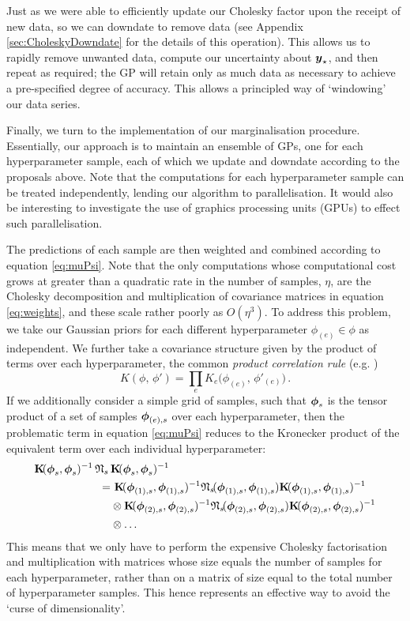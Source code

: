\documentclass{acmtrans2m}
\begin{document}
Just as we were able to efficiently update our Cholesky factor upon the receipt of new data, so we can downdate to remove data (see Appendix \ref{sec:CholeskyDowndate} for the details of this operation). This allows us to rapidly remove unwanted data, compute our uncertainty about $\boldsymbol{y}_\star$, and then repeat as required; the GP will retain only as much data as necessary to achieve a pre-specified degree of accuracy. This allows a principled way of `windowing' our data series.

Finally, we turn to the implementation of our marginalisation procedure. Essentially, our approach is to maintain an ensemble of GPs, one for each hyperparameter sample, each of which we update and downdate according to the proposals above. Note that the computations for each hyperparameter sample can be treated independently, lending our algorithm to parallelisation. It would also be interesting to investigate the use of graphics processing units (GPUs) to effect such parallelisation.

The predictions of each sample are then weighted and combined according to equation \eqref{eq:muPsi}. Note that the only computations whose computational cost grows at greater than a quadratic rate in the number of samples, $\eta$, are the Cholesky decomposition and multiplication of covariance matrices in equation \eqref{eq:weights}, and these scale rather poorly as $O(\eta^3)$. To address this problem, we take our Gaussian priors for each different hyperparameter $\phi_{(e)} \in \phi$ as independent. We further take a covariance structure given by the product of terms over each hyperparameter, the common \emph{product correlation rule} (e.g. )
\begin{equation}
 K(\phi,\,\phi')=\prod_e K_e\Big(\phi_{(e)},\,\phi'_{(e)}\Big)\,.
\end{equation}
If we additionally consider a simple grid of samples, such that $\boldsymbol{\phi}_s$ is the tensor product of a set of samples $\boldsymbol{\phi}_{(e),s}$ over each hyperparameter, then the problematic term in equation \eqref{eq:muPsi} reduces to the Kronecker product of the equivalent term over each individual hyperparameter:
\begin{align}\label{eq:KNK}
\mat{K} \!(\vph_s,\vph_s)^{-1}\,\Nt\,&\mat{K}\!(\vph_s,\vph_s)^{-1}\nonumber\\
 = & ~\mat{K}\!(\vph_{(1),s},\vph_{(1),s})^{-1}\Nt\!(\vph_{(1),s},\vph_{(1),s})\mat{K}\!(\vph_{(1),s},\vph_{(1),s})^{-1}\nonumber\\ & \otimes \mat{K}\!(\vph_{(2),s},\vph_{(2),s})^{-1}\Nt\!(\vph_{(2),s},\vph_{(2),s})\mat{K}\!(\vph_{(2),s},\vph_{(2),s})^{-1}\nonumber\\ & \otimes \ldots
\end{align}
This means that we only have to perform the expensive Cholesky factorisation and multiplication with matrices whose size equals the number of samples for each hyperparameter, rather than on a matrix of size equal to the total number of hyperparameter samples. This hence represents an effective way to avoid the `curse of dimensionality'. 
\end{document}
